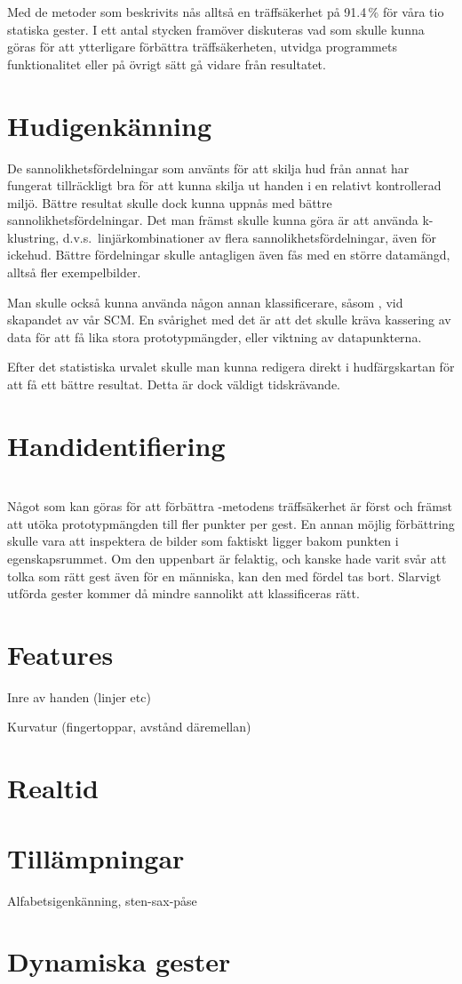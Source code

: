 \documentclass[../rapport_MVEX01-11-05]{subfiles}
\begin{document}
Med de metoder som beskrivits nås alltså en träffsäkerhet på 91.4\,\%
för våra tio statiska gester. I ett antal stycken framöver diskuteras
vad som skulle kunna göras för att ytterligare förbättra
träffsäkerheten, utvidga programmets funktionalitet eller på övrigt
sätt gå vidare från resultatet.

\section{Hudigenkänning}
De sannolikhetsfördelningar som använts för att skilja hud från annat
har fungerat tillräckligt bra för att kunna skilja ut handen i en
relativt kontrollerad miljö. Bättre resultat skulle dock kunna uppnås
med bättre sannolikhetsfördelningar. Det man främst skulle kunna göra
är att använda k-klustring, d.v.s.~linjärkombinationer av flera
sannolikhetsfördelningar, även för ickehud. Bättre fördelningar skulle
antagligen även fås med en större datamängd, alltså fler
exempelbilder.

Man skulle också kunna använda någon annan klassificerare, såsom \knn,
vid skapandet av vår SCM. En svårighet med det är att det skulle
kräva kassering av data för att få lika stora prototypmängder,
eller viktning av datapunkterna.

Efter det statistiska urvalet skulle man kunna redigera direkt i
hudfärgskartan för att få ett bättre resultat. Detta är dock väldigt
tidskrävande.

\section{Handidentifiering}

\section{\knn}
Något som kan göras för att förbättra \knn-metodens träffsäkerhet är först och
främst att utöka prototypmängden till fler punkter per gest. En annan möjlig
förbättring skulle vara att inspektera de bilder som faktiskt ligger bakom
punkten i egenskapsrummet. Om den uppenbart är felaktig, och kanske hade varit
svår att tolka som rätt gest även för en människa, kan den med fördel tas bort.
Slarvigt utförda gester kommer då mindre sannolikt att
klassificeras rätt.

\section{Features}
Inre av handen (linjer etc)

Kurvatur (fingertoppar, avstånd däremellan)

\section{Realtid}
\section{Tillämpningar}
Alfabetsigenkänning, sten-sax-påse

\section{Dynamiska gester}
\end{document}
